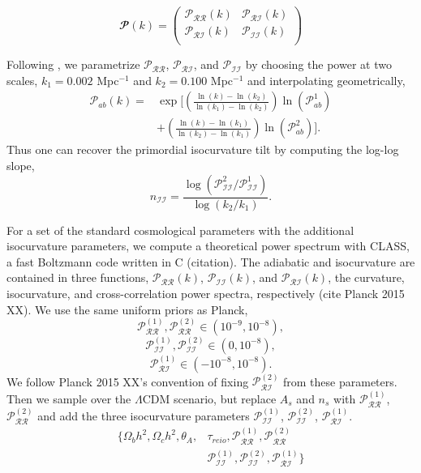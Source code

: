\documentclass{emulateapj}
\newcommand\prr{ \mathcal{P}_{\mathcal{R}\mathcal{R}} }
\newcommand\pri{ \mathcal{P}_{\mathcal{R}\mathcal{I}} }
\newcommand\pii{ \mathcal{P}_{\mathcal{I}\mathcal{I}} }
\begin{document}
\begin{equation}
\mathbfcal{P}(k) = \left( {\begin{array}{cc}
   \prr(k) & \pri(k) \\
   \pri(k) &  \pii(k) \\
  \end{array} } \right)
\end{equation}

Following \cite{planckXX:2015}, we parametrize $\prr$, $\pri$, and $\pii$ by choosing the power at two scales, $k_1 = 0.002$ Mpc$^{-1}$ and $k_2 = 0.100$ Mpc$^{-1}$ and interpolating geometrically,
\begin{align*}
\mathcal{P}_{ab}(k) = & \exp \bigg[ \left( \frac{\ln(k) - \ln(k_2)}{\ln(k_1) - \ln(k_2)}\right) \ln \left( \mathcal{P}_{ab}^1 \right) \\
& +
\left( \frac{\ln(k) - \ln(k_1)}{\ln(k_2) - \ln(k_1)}\right) \ln \left( \mathcal{P}_{ab}^2 \right) \bigg].
\end{align*}
Thus one can recover the primordial isocurvature tilt by computing the log-log slope, 
\begin{equation} n_{\mathcal{I}\mathcal{I}}  =  \frac{\log( \pii^2 / \pii^1 )}{\log ( k_2 / k_1 )}. \end{equation}

For a set of the standard cosmological parameters with the additional isocurvature parameters, we compute a theoretical power spectrum with CLASS, a fast Boltzmann code written in C (citation). The adiabatic and isocurvature are contained in three functions, $\mathcal{P}_{\mathcal{RR}}(k)$, $\mathcal{P}_{\mathcal{II}}(k)$, and $\mathcal{P}_{\mathcal{RI}}(k)$, the curvature, isocurvature, and cross-correlation power spectra, respectively (cite Planck 2015 XX).  We use the same uniform priors as Planck,
\begin{equation}
    \prr^{(1)}, \prr^{(2)} \in (10^{-9}, 10^{-8}),
\end{equation}
\begin{equation}
    \pii^{(1)}, \pii^{(2)} \in (0, 10^{-8}),
\end{equation}
\begin{equation}
    \pri^{(1)} \in (-10^{-8}, 10^{-8}).
\end{equation}
We follow Planck 2015 XX's convention of fixing $\pri^{(2)}$ from these parameters. Then we sample over the $\Lambda$CDM scenario, but replace $A_s$ and $n_s$ with $\prr^{(1)}$,  $\prr^{(2)}$ and add the three isocurvature parameters $\pii^{(1)}$, $\pii^{(2)}$, $\pri^{(1)}$.
\begin{align}
\{ \Omega_b h^2, \Omega_c h^2, \theta_A, &\tau_{reio}, \prr^{(1)}, \mathcal{P}_{\mathcal{RR}}^{(2)} \\
& \pii^{(1)}, \pii^{(2)}, \pri^{(1)}    \}
\end{align}
\end{document}
